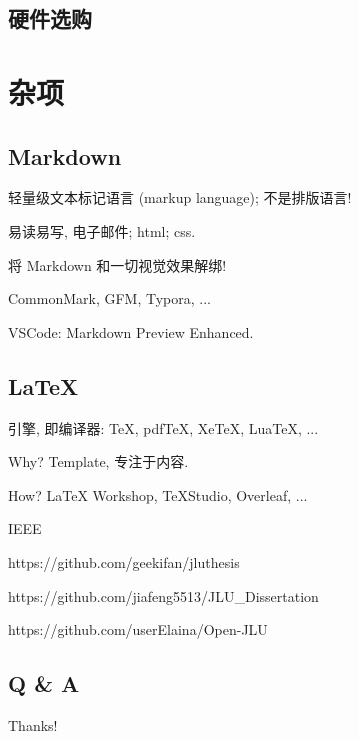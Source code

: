 \documentclass[a4paper]{article}
\begin{document}
\subsection{\LARGE 硬件选购}

\section{\LARGE 杂项}

\subsection{\LARGE Markdown}

轻量级文本标记语言 (markup language); 不是排版语言!

易读易写, 电子邮件; html; css.

将 Markdown 和一切视觉效果解绑!

CommonMark, GFM, Typora, ...

VSCode: Markdown Preview Enhanced.

\subsection{\LARGE LaTeX}

引擎, 即编译器: TeX, pdfTeX, XeTeX, LuaTeX, ...

Why? Template, 专注于内容.

How? LaTeX Workshop, TeXStudio, Overleaf, ...

IEEE

https://github.com/geekifan/jluthesis

https://github.com/jiafeng5513/JLU\_Dissertation

https://github.com/userElaina/Open-JLU

\subsection{\LARGE Q \& A}

\begin{center}
    {\Huge Thanks!}
\end{center}
\end{document}
